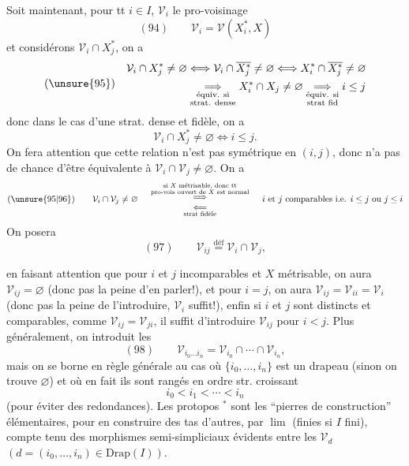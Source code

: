 Soit maintenant, pour tt $i\in I$, $\mathcal V_i$ le pro-voisinage
\[(94)\qquad\mathcal V_i=\mathcal V(X_i^*,X)\]
et considérons $\mathcal V_i\cap X_j^*$, on a
\[
(\unsure{95})\quad\begin{aligned}
\mathcal V_i\cap X_j^*\neq\varnothing&\Longleftrightarrow\mathcal V_i\cap\overline{X_j^*}\neq\varnothing\Longleftrightarrow X_i^*\cap\overline{X_j^*}\neq\varnothing\\
&\underset{\substack{\text{équiv. si}\\\text{strat. dense}}}{\Longrightarrow}X_i^*\cap X_j\neq\varnothing\underset{\substack{\text{équiv. si}\\\text{strat fid}}}{\Longrightarrow}i\leq j
\end{aligned}
\]
donc dans le cas d'une strat. dense et fidèle,  on a
\[\mathcal V_i\cap X_j^*\neq\varnothing\Longleftrightarrow i\leq j.\]
On fera attention que cette relation n'est pas symétrique en $(i,j)$,  donc n'a pas de chance d'être équivalente à $\mathcal V_i\cap\mathcal V_j\neq\varnothing$. On a
\[
(\unsure{95|96})\qquad\mathcal V_i\cap\mathcal V_j\neq\varnothing\quad
\begin{array}{c}
\overset{\substack{\text{si $X$ métrisable, donc tt}\\\text{pro-vois ouvert de $X$ est normal}}}{\Longrightarrow}\\
\underset{\text{strat fidèle}}{\Longleftarrow}
\end{array}
\quad\text{$i$ et $j$ comparables i.e. $i\leq j$ ou $j\leq i$}
\]
On posera
\[(97)\qquad\mathcal V_{ij}\overset{\mathrm{déf}}=\mathcal V_i\cap\mathcal V_j,\]

en faisant attention que pour $i$ et $j$ incomparables et $X$ métrisable, on  aura $\mathcal V_{ij}=\varnothing$  (donc pas la peine d'en parler!), et pour $i=j$, on aura $\mathcal V_{ij}=\mathcal V_{ii}=\mathcal V_i$ (donc pas la peine de l'introduire, $\mathcal V_i$ suffit!), enfin  si $i$ et $j$ sont distincts et comparables,  comme $\mathcal V_{ij}=\mathcal V_{ji}$, il suffit d'introduire $\mathcal V_{ij}$ pour  $i<j$. Plus généralement, on introduit les
\[(98)\qquad\mathcal V_{i_0\ldots i_n}=\mathcal V_{i_0}\cap\cdots\cap\mathcal V_{i_n},\]
mais on se borne en règle générale au cas où $\{i_0,\ldots,i_n\}$ est un drapeau (sinon on trouve $\varnothing$) et où en fait ils sont rangés en ordre str. croissant
\[i_0<i_1<\cdots<i_n\]
(pour éviter des redondances). Les protopos $^*$ sont les ``pierres de construction'' élémentaires, pour en construire des tas d'autres, par \uline{$\lim$} (finies si $I$ fini), compte tenu des morphismes semi-simpliciaux évidents entre les $\mathcal V_d$ $(d=(i_0,\ldots,i_n)\in\mathrm{Drap}(I))$.

